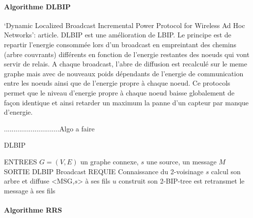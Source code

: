 \paragraph{Algorithme DLBIP}
`Dynamic Localized Broadcast Incremental Power Protocol for Wireless Ad Hoc Networks': article\cite{Champ2009DLBIP}.
DLBIP est une amélioration de LBIP. Le principe est de repartir l'energie consommée lors d'un broadcast en empreintant des chemins (arbre couvrants) différents en fonction de l'energie restantes des noeuds qui vont servir de relais.
A chaque broadcast, l'abre de diffusion est recalculé sur le meme graphe mais avec de nouveaux poids dépendants de l'energie de communication entre les noeuds ainsi que de l'energie propre à chaque noeud. Ce protocols permet que
le niveau d'energie propre à chaque noeud baisse globalement de façon identique et ainsi retarder un maximum la panne d'un capteur par manque d'energie.


.............................Algo a faire
\begin{algorithm}[h]
\caption{DLBIP}
\label{algo_DLBIP}
\begin{algorithmic}
\STATE ENTREES  $G=(V,E)$ un graphe connexe, $s$ une source, un message $M$
\STATE SORTIE  DLBIP Broadcast
\STATE REQUIE  Connaissance du 2-voisinage
\STATE $s$ calcul son arbre et diffuse <MSG,$s$> à ses fils
		\STATE $u$ construit son 2-BIP-tree est retransmet le message à ses fils
	\ENDIF
\ENDIF
\end{algorithmic}
\end{algorithm}



\paragraph{Algorithme RRS}
\cite{Cartigny2003RNG}
